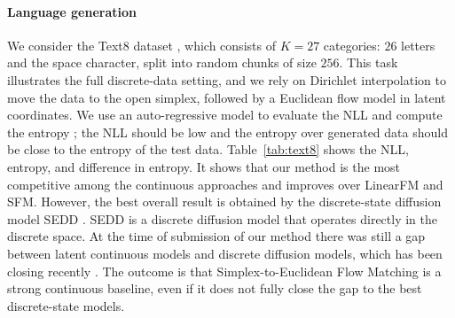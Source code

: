 \paragraph{Language generation}
We consider the Text8 dataset \citep{Mahoney2011}, which consists of $K=27$ categories: $26$ letters and the space character, split into random chunks of size $256$. This task illustrates the full discrete-data setting, and we rely on Dirichlet interpolation to move the data to the open simplex, followed by a Euclidean flow model in latent coordinates. We use an auto-regressive model to evaluate the NLL and compute the entropy \citep{Wang2021}; the NLL should be low and the entropy over generated data should be close to the entropy of the test data.
Table~\ref{tab:text8} shows the NLL, entropy, and difference in entropy. It shows that our method is the most competitive among the continuous approaches and improves over LinearFM and SFM. However, the best overall result is obtained by the discrete-state diffusion model SEDD \citep{Lou2024}. SEDD is a discrete diffusion model that operates directly in the discrete space. At the time of submission of our method there was still a gap between latent continuous models and discrete diffusion models, which has been closing recently \citep{lee2026flow}. The outcome is that Simplex-to-Euclidean Flow Matching is a strong continuous baseline, even if it does not fully close the gap to the best discrete-state models.





